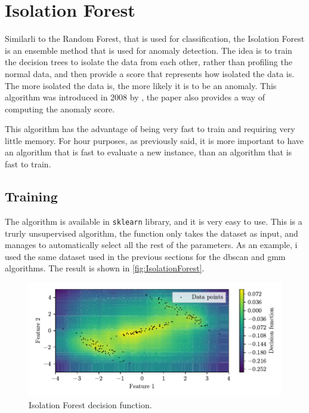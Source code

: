 \section{Isolation Forest}
\label{sec:IsolationForest}

Similarli to the Random Forest, that is used for classification, the Isolation Forest is an ensemble method that is used for anomaly detection. The idea is to train the decision trees to isolate the data from each other, rather than profiling the normal data, and then provide a score that represents how isolated the data is. The more isolated the data is, the more likely it is to be an anomaly. This algorithm was introduced in 2008 by \cite{iforest}, the paper also provides a way of computing the anomaly score.

This algorithm has the advantage of being very fast to train and requiring very little memory. For hour purposes, as previously said, it is more important to have an algorithm that is fast to evaluate a new instance, than an algorithm that is fast to train.

\subsection{Training}
The algorithm is available in \texttt{sklearn} library, and it is very easy to use. This is a trurly unsupervised algorithm, the function only takes the dataset as input, and manages to automatically select all the rest of the parameters. As an example, i used the same dataset used in the previous sections for the \gls{dbscan} and {\gls{gmm}} algorithms. The result is shown in \autoref{fig:IsolationForest}.

\begin{figure}
    \centering
    \includegraphics{images/IForest/Figure_1.pdf}
    \caption{Isolation Forest decision function.}
    \label{fig:IsolationForest}
\end{figure}

